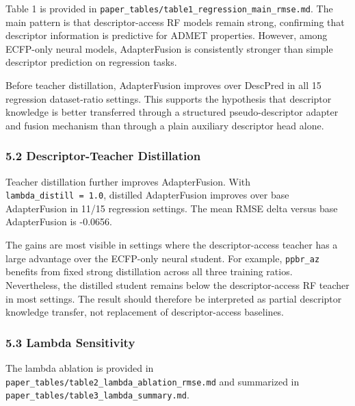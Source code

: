 \documentclass[
]{article}
\begin{document}
Table 1 is provided in
\texttt{paper\_tables/table1\_regression\_main\_rmse.md}. The main
pattern is that descriptor-access RF models remain strong, confirming
that descriptor information is predictive for ADMET properties. However,
among ECFP-only neural models, AdapterFusion is consistently stronger
than simple descriptor prediction on regression tasks.

Before teacher distillation, AdapterFusion improves over DescPred in all
15 regression dataset-ratio settings. This supports the hypothesis that
descriptor knowledge is better transferred through a structured
pseudo-descriptor adapter and fusion mechanism than through a plain
auxiliary descriptor head alone.

\subsubsection{5.2 Descriptor-Teacher
Distillation}\label{descriptor-teacher-distillation-1}

Teacher distillation further improves AdapterFusion. With
\texttt{lambda\_distill\ =\ 1.0}, distilled AdapterFusion improves over
base AdapterFusion in 11/15 regression settings. The mean RMSE delta
versus base AdapterFusion is -0.0656.

The gains are most visible in settings where the descriptor-access
teacher has a large advantage over the ECFP-only neural student. For
example, \texttt{ppbr\_az} benefits from fixed strong distillation
across all three training ratios. Nevertheless, the distilled student
remains below the descriptor-access RF teacher in most settings. The
result should therefore be interpreted as partial descriptor knowledge
transfer, not replacement of descriptor-access baselines.

\subsubsection{5.3 Lambda Sensitivity}\label{lambda-sensitivity}

The lambda ablation is provided in
\texttt{paper\_tables/table2\_lambda\_ablation\_rmse.md} and summarized
in \texttt{paper\_tables/table3\_lambda\_summary.md}.
\end{document}
